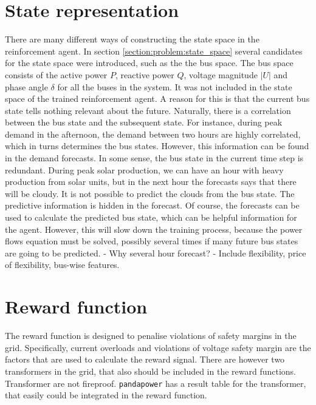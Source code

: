 \documentclass[class=book, crop=false]{standalone}
\begin{document}
\section{State representation}
There are many different ways of constructing the state space in the reinforcement agent. In section \ref{section:problem:state_space} several candidates for the state space were introduced, such as the the bus space. The bus space consists of the active power $P$, reactive power $Q$, voltage magnitude $|U|$ and phase angle $\delta$ for all the buses in the system. It was not included in the state space of the trained reinforcement agent. A reason for this is that the current bus state tells nothing relevant about the future. Naturally, there is a correlation between the bus state and the subsequent state. For instance, during peak demand in the afternoon, the demand between two hours are highly correlated, which in turns determines the bus states. However, this information can be found in the demand forecasts. In some sense, the bus state in the current time step is redundant. During peak solar production, we can have an hour with heavy production from solar units, but in the next hour the forecasts says that there will be cloudy. It is not possible to predict the clouds from the bus state. The predictive information is hidden in the forecast. Of course, the forecasts can be used to calculate the predicted bus state, which can be helpful information for the agent. However, this will slow down the training process, because the power flows equation must be solved, possibly several times if many future bus states are going to be predicted. 
- Why several hour forecast?
- Include flexibility, price of flexibility, bus-wise features. 


\section{Reward function}
The reward function is designed to penalise violations of safety margins in the grid. Specifically, current overloads and violations of voltage safety margin are the factors that are used to calculate the reward signal. There are however two transformers in the grid, that also should be included in the reward functions. Transformer are not fireproof. \texttt{pandapower} has a result table for the transformer, that easily could be integrated in the reward function.
\end{document}
